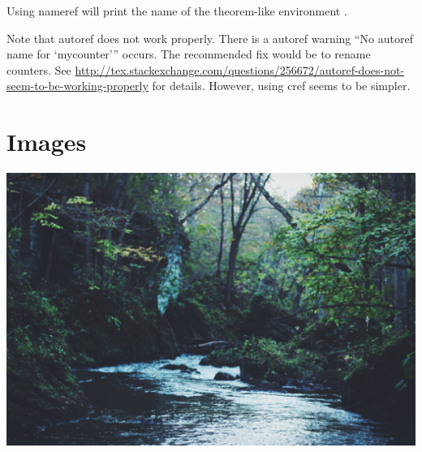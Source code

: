 \documentclass{article}
\numberwithin{equation}{mycounter} %
\theoremstyle{plain}
\theoremstyle{definition}
\theoremstyle{remark}
\theoremstyle{style1}
\begin{document}
Using nameref will print the name of the theorem-like environment .

Note that autoref does not work properly.
There is a autoref warning \enquote{No autoref name for \enquote{mycounter}} occurs.
The recommended fix would be to rename counters.
See \url{http://tex.stackexchange.com/questions/256672/autoref-does-not-seem-to-be-working-properly} for details.
However, using cref seems to be simpler.

\section{Images}
\includegraphics[width=1\textwidth]{stream.jpg}

\nocite{*}
\printbibliography[title={Reference}]
\end{document}
